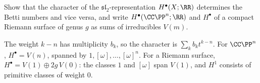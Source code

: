 \begin{exercise}\label{kahler:exercise-sl2-weights-cohomology}
Show that the character of the $\mathfrak{sl}_2$-representation $H^\bullet(X; \RR)$ determines the Betti numbers and vice versa, and write
$H^\bullet(\CC\PP^n; \RR)$ and $H^\bullet$ of a compact Riemann surface of genus $g$ as sums of irreducibles $V(m)$.
\end{exercise}

\begin{solution}
The weight $k - n$ has multiplicity $b_k$, so the character is $\sum_kb_kt^{k-n}$. For $\CC\PP^n$, $H^\bullet = V(n)$, spanned by
$1, [\omega], \ldots, [\omega]^n$. For a Riemann surface, $H^\bullet = V(1) \oplus 2g\,V(0)$: the classes $1$ and $[\omega]$ span $V(1)$, and $H^1$
consists of primitive classes of weight $0$.
\end{solution}
